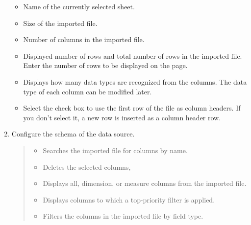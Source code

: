 \documentclass[letterpaper,10pt,english]{sphinxmanual}
\begin{document}
\begin{enumerate}
\begin{itemize}
\item {} 
 Name of the currently selected sheet.

\item {} 
 Size of the imported file.

\item {} 
 Number of columns in the imported file.

\item {} 
 Displayed number of rows and total number of rows in the imported file. Enter the number of rows to be displayed on the page.

\item {} 
 Displays how many data types are recognized from the columns. The data type of each column can be modified later.

\item {} 
 Select the check box to use the first row of the file as column headers. If you don’t select it, a new row is inserted as a column header row.

\end{itemize}

\item {} 
Configure the schema of the data source.
\begin{quote}

\begin{figure}[H]
\centering

\noindent{}
\end{figure}
\begin{itemize}
\item {} 
 Searches the imported file for columns by name.

\item {} 
  Deletes the selected columns,

\item {} 
 Displays all, dimension, or measure columns from the imported file.

\item {} 
 Displays columns to which a top-priority filter is applied.

\item {} 
 Filters the columns in the imported file by field type.


\end{itemize}
\end{quote}
\end{enumerate}
\end{document}
